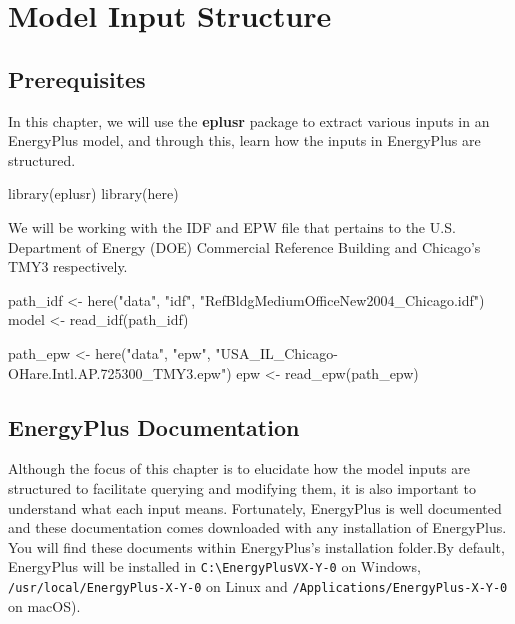 \documentclass[
]{book}
\newenvironment{Shaded}{\begin{snugshade}}{\end{snugshade}}
\newcommand{\FunctionTok}[1]{\textcolor[rgb]{0.00,0.00,0.00}{#1}}
\newcommand{\NormalTok}[1]{#1}
\newcommand{\OtherTok}[1]{\textcolor[rgb]{0.56,0.35,0.01}{#1}}
\newcommand{\StringTok}[1]{\textcolor[rgb]{0.31,0.60,0.02}{#1}}
\begin{document}
\hypertarget{input}{%
\chapter{Model Input Structure}\label{input}}

\hypertarget{prerequisites-10}{%
\section{Prerequisites}\label{prerequisites-10}}

In this chapter, we will use the \textbf{eplusr} package to extract various inputs in an EnergyPlus model, and through this, learn how the inputs in EnergyPlus are structured.

\begin{Shaded}
\begin{Highlighting}[]
\FunctionTok{library}\NormalTok{(eplusr)}
\FunctionTok{library}\NormalTok{(here)}
\end{Highlighting}
\end{Shaded}

We will be working with the IDF and EPW file that pertains to the U.S. Department of Energy (DOE) Commercial Reference Building and Chicago's TMY3 respectively.

\begin{Shaded}
\begin{Highlighting}[]
\NormalTok{path\_idf }\OtherTok{\textless{}{-}} \FunctionTok{here}\NormalTok{(}\StringTok{"data"}\NormalTok{, }\StringTok{"idf"}\NormalTok{, }\StringTok{"RefBldgMediumOfficeNew2004\_Chicago.idf"}\NormalTok{)}
\NormalTok{model }\OtherTok{\textless{}{-}} \FunctionTok{read\_idf}\NormalTok{(path\_idf)}

\NormalTok{path\_epw }\OtherTok{\textless{}{-}} \FunctionTok{here}\NormalTok{(}\StringTok{"data"}\NormalTok{, }\StringTok{"epw"}\NormalTok{, }\StringTok{"USA\_IL\_Chicago{-}OHare.Intl.AP.725300\_TMY3.epw"}\NormalTok{)}
\NormalTok{epw }\OtherTok{\textless{}{-}} \FunctionTok{read\_epw}\NormalTok{(path\_epw)}
\end{Highlighting}
\end{Shaded}

\hypertarget{energyplus-documentation}{%
\section{EnergyPlus Documentation}\label{energyplus-documentation}}

Although the focus of this chapter is to elucidate how the model inputs are structured to facilitate querying and modifying them, it is also important to understand what each input means. Fortunately, EnergyPlus is well documented and these documentation comes downloaded with any installation of EnergyPlus. You will find these documents within EnergyPlus's installation folder.By default, EnergyPlus will be installed in \texttt{C:\textbackslash{}EnergyPlusVX-Y-0} on Windows, \texttt{/usr/local/EnergyPlus-X-Y-0} on Linux and \texttt{/Applications/EnergyPlus-X-Y-0} on macOS).
\end{document}
